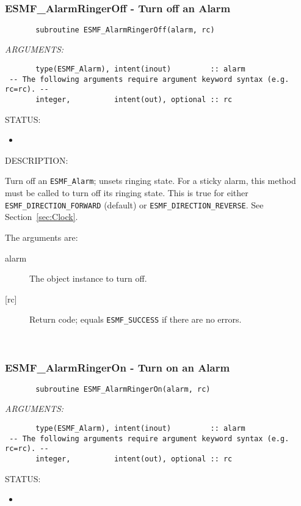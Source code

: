  
\mbox{}\hrulefill\ 
 
\subsubsection [ESMF\_AlarmRingerOff] {ESMF\_AlarmRingerOff - Turn off an Alarm}


 
\begin{verbatim}       subroutine ESMF_AlarmRingerOff(alarm, rc)
 \end{verbatim}{\em ARGUMENTS:}
\begin{verbatim}       type(ESMF_Alarm), intent(inout)         :: alarm
 -- The following arguments require argument keyword syntax (e.g. rc=rc). --
       integer,          intent(out), optional :: rc
 \end{verbatim}
{\sf STATUS:}
   \begin{itemize}
   \item{}
   \end{itemize}
  
{\sf DESCRIPTION:\\ }


       Turn off an {\tt ESMF\_Alarm}; unsets ringing state.  For a sticky
       alarm, this method must be called to turn off its ringing state.
       This is true for either {\tt ESMF\_DIRECTION\_FORWARD} (default) or
       {\tt ESMF\_DIRECTION\_REVERSE}.  See Section~\ref{sec:Clock}.
  
       The arguments are:
       \begin{description}
       \item[alarm]
            The object instance to turn off.
       \item[{[rc]}]
            Return code; equals {\tt ESMF\_SUCCESS} if there are no errors.
       \end{description} 
 
\mbox{}\hrulefill\ 
 
\subsubsection [ESMF\_AlarmRingerOn] {ESMF\_AlarmRingerOn - Turn on an Alarm}


 
 
\begin{verbatim}       subroutine ESMF_AlarmRingerOn(alarm, rc)
 \end{verbatim}{\em ARGUMENTS:}
\begin{verbatim}       type(ESMF_Alarm), intent(inout)         :: alarm
 -- The following arguments require argument keyword syntax (e.g. rc=rc). --
       integer,          intent(out), optional :: rc
 \end{verbatim}
{\sf STATUS:}
   \begin{itemize}
   \item{}
   \end{itemize}
  
